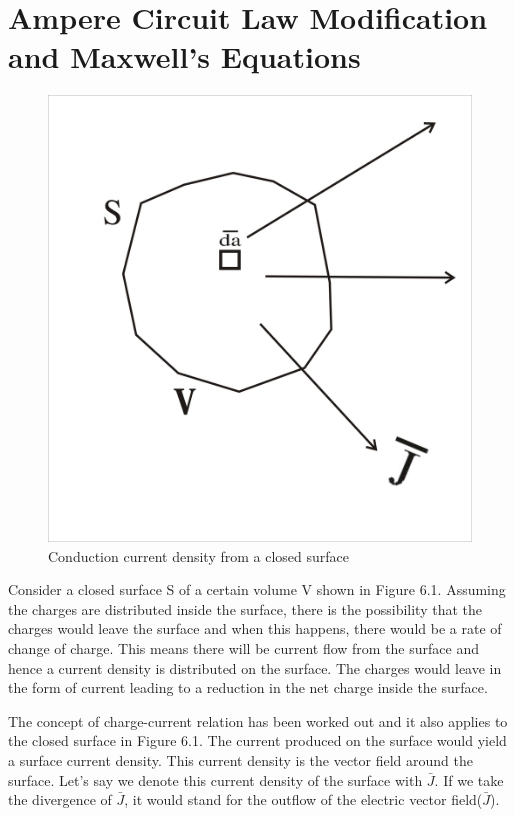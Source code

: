 \section{Ampere Circuit Law Modification and Maxwell's Equations}
\begin{figure}[h]
\centering
\includegraphics[width=.7\linewidth]{graphics/closedsurface}
\caption{Conduction current density from a closed surface}
\end{figure}

Consider a closed surface S of a certain volume V shown in Figure 6.1. Assuming the charges are distributed inside the surface, there is the possibility that the charges would leave the surface and when this happens, there would be a rate of change of charge. This means there will be current flow from the surface and hence a current density is distributed on the surface. The charges would leave in the form of current leading to a reduction in the net charge inside the surface.

The concept of charge-current relation has been worked out and it also applies to the closed surface in Figure 6.1. The current produced on the surface would yield a surface current density. This current density is the vector field around the surface. Let's say we denote this current density of the surface with $\bar{J}$. If we take the divergence of $\bar{J}$, it would stand for the outflow of the electric vector field($\bar{J}$).

